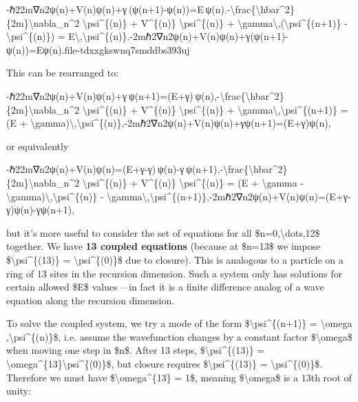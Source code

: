 \documentclass[
]{article}
\begin{document}
{-ℏ22m∇n2ψ(n)+V(n)ψ(n)+γ (ψ(n+1)-ψ(n))=E ψ(n).-\textbackslash frac\{\textbackslash hbar\^{}2\}\{2m\}\textbackslash nabla\_n\^{}2
\textbackslash psi\^{}\{(n)\} + V\^{}\{(n)\}
\textbackslash psi\^{}\{(n)\} +
\textbackslash gamma\textbackslash,(\textbackslash psi\^{}\{(n+1)\} -
\textbackslash psi\^{}\{(n)\}) =
E\textbackslash,\textbackslash psi\^{}\{(n)\}.-2mℏ2\hspace{0pt}∇n2\hspace{0pt}ψ(n)+V(n)ψ(n)+γ(ψ(n+1)-ψ(n))=Eψ(n).\hspace{0pt}file-tdxxgkswnq7smddbs393uj\hspace{0pt}

This can be rearranged to:

-ℏ22m∇n2ψ(n)+V(n)ψ(n)+γ ψ(n+1)=(E+γ) ψ(n),-\textbackslash frac\{\textbackslash hbar\^{}2\}\{2m\}\textbackslash nabla\_n\^{}2
\textbackslash psi\^{}\{(n)\} + V\^{}\{(n)\}
\textbackslash psi\^{}\{(n)\} +
\textbackslash gamma\textbackslash,\textbackslash psi\^{}\{(n+1)\} = (E
+
\textbackslash gamma)\textbackslash,\textbackslash psi\^{}\{(n)\},-2mℏ2\hspace{0pt}∇n2\hspace{0pt}ψ(n)+V(n)ψ(n)+γψ(n+1)=(E+γ)ψ(n),

or equivalently

-ℏ22m∇n2ψ(n)+V(n)ψ(n)=(E+γ-γ) ψ(n)-γ ψ(n+1),-\textbackslash frac\{\textbackslash hbar\^{}2\}\{2m\}\textbackslash nabla\_n\^{}2
\textbackslash psi\^{}\{(n)\} + V\^{}\{(n)\}
\textbackslash psi\^{}\{(n)\} = (E + \textbackslash gamma -
\textbackslash gamma)\textbackslash,\textbackslash psi\^{}\{(n)\} -
\textbackslash gamma\textbackslash,\textbackslash psi\^{}\{(n+1)\},-2mℏ2\hspace{0pt}∇n2\hspace{0pt}ψ(n)+V(n)ψ(n)=(E+γ-γ)ψ(n)-γψ(n+1),

but it's more useful to consider the set of equations for all
\$n=0,\textbackslash dots,12\$ together. We have \textbf{13 coupled
equations} (because at \$n=13\$ we impose
\$\textbackslash psi\^{}\{(13)\} = \textbackslash psi\^{}\{(0)\}\$ due
to closure)\hspace{0pt}. This is analogous to a particle on a ring of 13
sites in the recursion dimension. Such a system only has solutions for
certain allowed \$E\$ values -- in fact it is a finite difference analog
of a wave equation along the recursion dimension.

To solve the coupled system, we try a mode of the form
\$\textbackslash psi\^{}\{(n+1)\} = \textbackslash omega
,\textbackslash psi\^{}\{(n)\}\$, i.e. assume the wavefunction changes
by a constant factor \$\textbackslash omega\$ when moving one step in
\$n\$\hspace{0pt}. After 13 steps, \$\textbackslash psi\^{}\{(13)\} =
\textbackslash omega\^{}\{13\}\textbackslash psi\^{}\{(0)\}\$, but
closure requires \$\textbackslash psi\^{}\{(13)\} =
\textbackslash psi\^{}\{(0)\}\$. Therefore we must have
\$\textbackslash omega\^{}\{13\} = 1\$, meaning \$\textbackslash omega\$
is a 13th root of unity:

}
\end{document}
